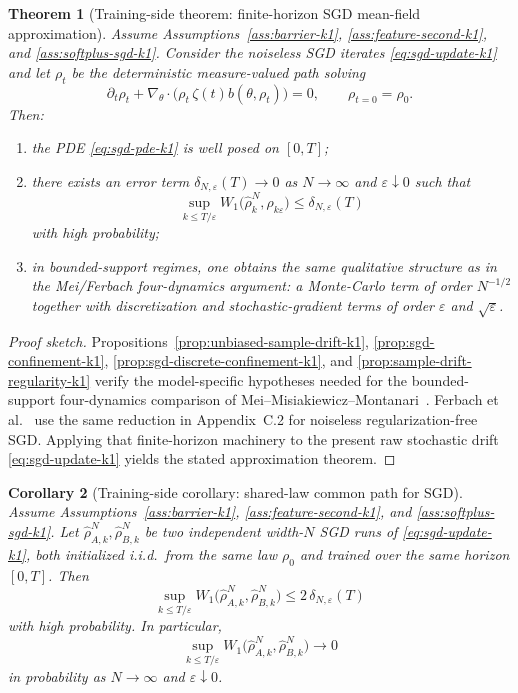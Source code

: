 \documentclass[11pt]{article}
\newtheorem{theorem}{Theorem}
\newtheorem{corollary}[theorem]{Corollary}
\theoremstyle{definition}
\begin{document}
\begin{theorem}[Training-side theorem: finite-horizon SGD mean-field approximation]
\label{thm:sgd-mean-field-k1}
Assume Assumptions~\ref{ass:barrier-k1}, \ref{ass:feature-second-k1}, and
\ref{ass:softplus-sgd-k1}. Consider the noiseless SGD iterates
\eqref{eq:sgd-update-k1} and let $\rho_t$ be the deterministic measure-valued
path solving
\begin{equation}
  \partial_t \rho_t
  +
  \nabla_\theta\cdot\bigl(\rho_t\,\zeta(t)b(\theta,\rho_t)\bigr)
  =
  0,
  \qquad
  \rho_{t=0}=\rho_0.
  \label{eq:sgd-pde-k1}
\end{equation}
Then:
\begin{enumerate}[label=(\roman*)]
  \item the PDE \eqref{eq:sgd-pde-k1} is well posed on $[0,T]$;
  \item there exists an error term $\delta_{N,\varepsilon}(T)\to 0$ as
  $N\to\infty$ and $\varepsilon\downarrow 0$ such that
  \[
    \sup_{k\le T/\varepsilon}
    W_1\!\bigl(\hat\rho_k^N,\rho_{k\varepsilon}\bigr)
    \le
    \delta_{N,\varepsilon}(T)
  \]
  with high probability;
  \item in bounded-support regimes, one obtains the same qualitative structure
  as in the Mei/Ferbach four-dynamics argument: a Monte-Carlo term of order
  $N^{-1/2}$ together with discretization and stochastic-gradient terms of
  order $\varepsilon$ and $\sqrt{\varepsilon}$.
\end{enumerate}
\end{theorem}

\begin{proof}[Proof sketch]
Propositions~\ref{prop:unbiased-sample-drift-k1},
\ref{prop:sgd-confinement-k1}, \ref{prop:sgd-discrete-confinement-k1}, and
\ref{prop:sample-drift-regularity-k1} verify the model-specific hypotheses
needed for the bounded-support four-dynamics comparison of
Mei--Misiakiewicz--Montanari~\cite{MeiMisiakiewiczMontanari2019}. Ferbach et
al.~\cite{Ferbach2024} use the same reduction in Appendix~C.2 for noiseless
regularization-free SGD. Applying that finite-horizon machinery to the present
raw stochastic drift \eqref{eq:sgd-update-k1} yields the stated approximation
theorem.
\end{proof}

\begin{corollary}[Training-side corollary: shared-law common path for SGD]
\label{cor:sgd-common-path-k1}
Assume Assumptions~\ref{ass:barrier-k1}, \ref{ass:feature-second-k1}, and
\ref{ass:softplus-sgd-k1}. Let $\hat\rho_{A,k}^N,\hat\rho_{B,k}^N$ be two
independent width-$N$ SGD runs of \eqref{eq:sgd-update-k1}, both initialized
i.i.d.\ from the same law $\rho_0$ and trained over the same horizon $[0,T]$.
Then
\[
  \sup_{k\le T/\varepsilon}
  W_1\!\bigl(\hat\rho_{A,k}^N,\hat\rho_{B,k}^N\bigr)
  \le
  2\,\delta_{N,\varepsilon}(T)
\]
with high probability. In particular,
\[
  \sup_{k\le T/\varepsilon}
  W_1\!\bigl(\hat\rho_{A,k}^N,\hat\rho_{B,k}^N\bigr)\to 0
\]
in probability as $N\to\infty$ and $\varepsilon\downarrow 0$.
\end{corollary}
\end{document}
